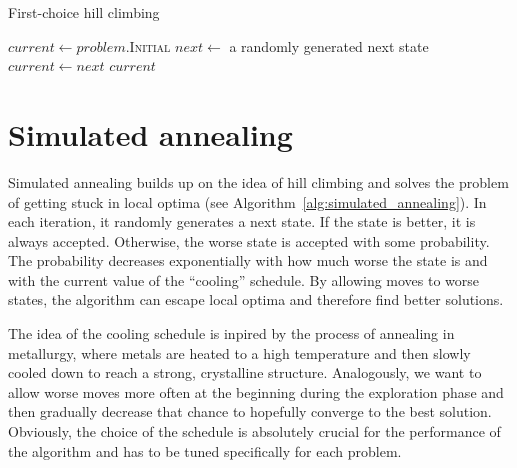 
\begin{algorithm}

\begin{algorithmic}
\caption{First-choice hill climbing} \label{alg:first_choice_hill_climbing}
\State $current \gets problem$.I\textsc{nitial}
    \State $next \gets$ a randomly generated next state
        \State $current \gets next$
    \EndIf
\EndFor
\State \Return $current$
\EndFunction
\end{algorithmic}
\end{algorithm}

\section{Simulated annealing} \label{sec:simulated_annealing}

Simulated annealing \cite{russell2020artificial, luke2013essentials} builds up on the idea of hill climbing and solves the problem of getting stuck in local optima (see Algorithm~\ref{alg:simulated_annealing}). In each iteration, it randomly generates a next state. If the state is better, it is always accepted. Otherwise, the worse state is accepted with some probability. The probability decreases exponentially with how much worse the state is and with the current value of the ``cooling'' schedule. By allowing moves to worse states, the algorithm can escape local optima and therefore find better solutions.

The idea of the cooling schedule is inpired by the process of annealing in metallurgy, where metals are heated to a high temperature and then slowly cooled down to reach a strong, crystalline structure. Analogously, we want to allow worse moves more often at the beginning during the exploration phase and then gradually decrease that chance to hopefully converge to the best solution. Obviously, the choice of the schedule is absolutely crucial for the performance of the algorithm and has to be tuned specifically for each problem.


